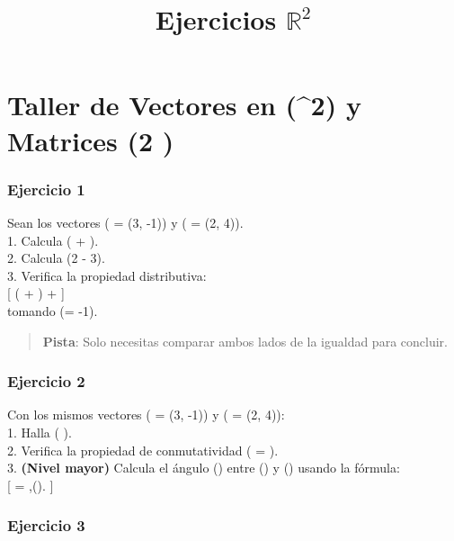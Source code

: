 \documentclass[
  letterpaper,
  DIV=11,
  numbers=noendperiod]{scrartcl}
\title{Ejercicios \(\mathbb{R}^2\)}
\author{}
\date{}
\begin{document}
\maketitle


\section{\texorpdfstring{Taller de Vectores en (\^{}2) y
Matrices (2
)}{Taller de Vectores en (\^{}2) y Matrices (2 )}}\label{taller-de-vectores-en-2-y-matrices-2}

\subsubsection{Ejercicio 1}\label{ejercicio-1}

Sean los vectores ( = (3, -1)) y ( = (2, 4)).\\
1. Calcula ( + ).\\
2. Calcula (2 - 3).\\
3. Verifica la propiedad distributiva:\\
{[} \alpha( + )  \alpha{} +
\alpha{} {]}\\
tomando (\alpha = -1).

\begin{quote}
\textbf{Pista}: Solo necesitas comparar ambos lados de la igualdad para
concluir.
\end{quote}

\subsubsection{Ejercicio 2}\label{ejercicio-2}

Con los mismos vectores ( = (3, -1)) y ( = (2,
4)):\\
1. Halla ( \cdot {}).\\
2. Verifica la propiedad de conmutatividad ( \cdot {}
=  \cdot {}).\\
3. \textbf{(Nivel mayor)} Calcula el ángulo (\theta) entre ()
y () usando la fórmula:\\
{[}  \cdot {} =
\textbar{}\textbar,\textbar{}\textbar{}\cos(\theta).
{]}

\subsubsection{Ejercicio 3}\label{ejercicio-3}
\end{document}
